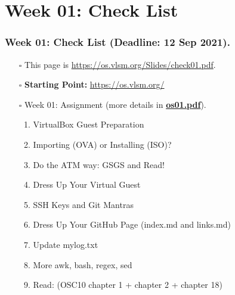 

\section{Week 01: Check List}
\begin{frame}
\frametitle{Week 01: Check List (Deadline: 12 Sep 2021).}
\begin{itemize}
\item [$\square$] This page is \url{https://os.vlsm.org/Slides/check01.pdf}.
\item [$\square$] \textbf{Starting Point:} \url{https://os.vlsm.org/}
\item [$\square$] Week 01: Assignment (more details in \href{https://os.vlsm.org/Slides/os01.pdf}{\textbf{os01.pdf}}).
\begin{enumerate}
\item VirtualBox Guest Preparation
\item Importing (OVA) or Installing (ISO)?
\item Do the ATM way: GSGS and Read!
\item Dress Up Your Virtual Guest
\item SSH Keys and Git Mantras
\item Dress Up Your GitHub Page (index.md and links.md)
\item Update mylog.txt
\item More awk, bash, regex, sed
\item Read: (OSC10 chapter 1 + chapter 2 + chapter 18)
\end{enumerate}
\end{itemize}
\end{frame}

